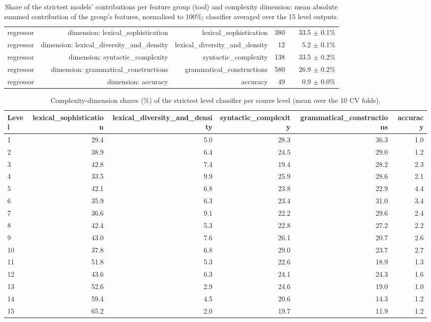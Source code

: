 \begin{table}[t]
\begin{tabular}{lrrrrr}
regressor & dimension: lexical\_sophistication & lexical\_sophistication & 380 &  & 33.5 $\pm$ 0.1\% \\
regressor & dimension: lexical\_diversity\_and\_density & lexical\_diversity\_and\_density & 12 &  & 5.2 $\pm$ 0.1\% \\
regressor & dimension: syntactic\_complexity & syntactic\_complexity & 138 &  & 33.5 $\pm$ 0.2\% \\
regressor & dimension: grammatical\_constructions & grammatical\_constructions & 580 &  & 26.9 $\pm$ 0.2\% \\
regressor & dimension: accuracy & accuracy & 49 &  & 0.9 $\pm$ 0.0\% \\
\bottomrule
\end{tabular}
\caption{Share of the strictest models' contributions per feature group (tool) and complexity dimension: mean absolute summed contribution of the group's features, normalised to 100\%; classifier averaged over the 15 level outputs.}
\label{tab:table_6_group_importance_strictest}
\end{table}

\begin{table}[t]
\centering
\small
\begin{tabular}{lrrrrr}
\toprule
Level & lexical\_sophistication & lexical\_diversity\_and\_density & syntactic\_complexity & grammatical\_constructions & accuracy \\
\midrule
1 & 29.4 & 5.0 & 28.3 & 36.3 & 1.0 \\
2 & 38.9 & 6.4 & 24.5 & 29.0 & 1.2 \\
3 & 42.8 & 7.4 & 19.4 & 28.2 & 2.3 \\
4 & 33.5 & 9.9 & 25.9 & 28.6 & 2.1 \\
5 & 42.1 & 6.8 & 23.8 & 22.9 & 4.4 \\
6 & 35.9 & 6.3 & 23.4 & 31.0 & 3.4 \\
7 & 36.6 & 9.1 & 22.2 & 29.6 & 2.4 \\
8 & 42.4 & 5.3 & 22.8 & 27.2 & 2.2 \\
9 & 43.0 & 7.6 & 26.1 & 20.7 & 2.6 \\
10 & 37.8 & 6.8 & 29.0 & 23.7 & 2.7 \\
11 & 51.8 & 5.3 & 22.6 & 18.9 & 1.3 \\
12 & 43.6 & 6.3 & 24.1 & 24.3 & 1.6 \\
13 & 52.6 & 2.9 & 24.6 & 19.0 & 1.0 \\
14 & 59.4 & 4.5 & 20.6 & 14.3 & 1.2 \\
15 & 65.2 & 2.0 & 19.7 & 11.9 & 1.2 \\
\bottomrule
\end{tabular}
\caption{Complexity-dimension shares (\%) of the strictest level classifier per course level (mean over the 10 CV folds).}
\label{tab:table_6b_dimension_shares_by_level_strictest}
\end{table}

